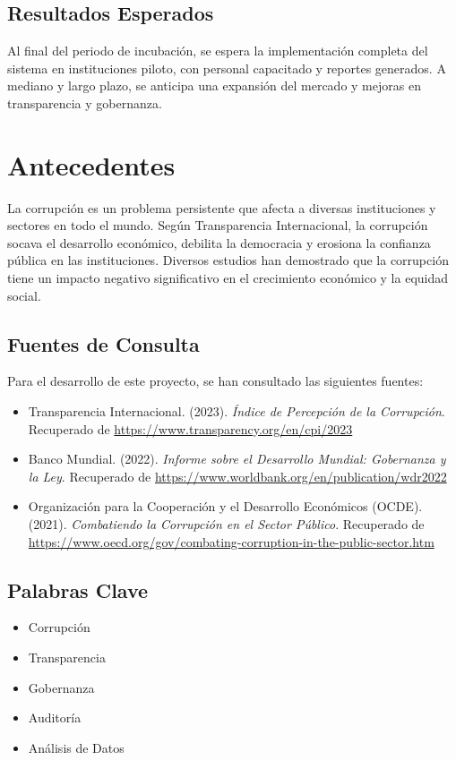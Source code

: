 \documentclass[a4paper,12pt]{article}
\begin{document}
\subsection*{Resultados Esperados}
Al final del periodo de incubación, se espera la implementación completa del sistema en instituciones piloto, con personal capacitado y reportes generados. A mediano y largo plazo, se anticipa una expansión del mercado y mejoras en transparencia y gobernanza.

\section{Antecedentes}
La corrupción es un problema persistente que afecta a diversas instituciones y sectores en todo el mundo. Según Transparencia Internacional, la corrupción socava el desarrollo económico, debilita la democracia y erosiona la confianza pública en las instituciones. Diversos estudios han demostrado que la corrupción tiene un impacto negativo significativo en el crecimiento económico y la equidad social.

\subsection{Fuentes de Consulta}
Para el desarrollo de este proyecto, se han consultado las siguientes fuentes:

\begin{itemize}
    \item Transparencia Internacional. (2023). \textit{Índice de Percepción de la Corrupción}. Recuperado de \url{https://www.transparency.org/en/cpi/2023}
    \item Banco Mundial. (2022). \textit{Informe sobre el Desarrollo Mundial: Gobernanza y la Ley}. Recuperado de \url{https://www.worldbank.org/en/publication/wdr2022}
    \item Organización para la Cooperación y el Desarrollo Económicos (OCDE). (2021). \textit{Combatiendo la Corrupción en el Sector Público}. Recuperado de \url{https://www.oecd.org/gov/combating-corruption-in-the-public-sector.htm}
\end{itemize}

\subsection{Palabras Clave}
\begin{itemize}
    \item Corrupción
    \item Transparencia
    \item Gobernanza
    \item Auditoría
    \item Análisis de Datos
\end{itemize}
\end{document}

